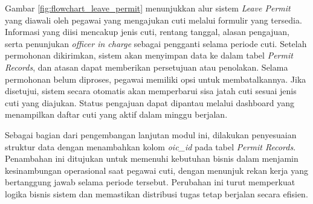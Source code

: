 Gambar \ref{fig:flowchart_leave_permit} menunjukkan alur sistem \textit{Leave Permit} yang diawali oleh pegawai yang mengajukan cuti melalui formulir yang tersedia. Informasi yang diisi mencakup jenis cuti, rentang tanggal, alasan pengajuan, serta penunjukan \textit{officer in charge} sebagai pengganti selama periode cuti. Setelah permohonan dikirimkan, sistem akan menyimpan data ke dalam tabel \textit{Permit Records}, dan atasan dapat memberikan persetujuan atau penolakan. Selama permohonan belum diproses, pegawai memiliki opsi untuk membatalkannya. Jika disetujui, sistem secara otomatis akan memperbarui sisa jatah cuti sesuai jenis cuti yang diajukan. Status pengajuan dapat dipantau melalui dashboard yang menampilkan daftar cuti yang aktif dalam minggu berjalan.

Sebagai bagian dari pengembangan lanjutan modul ini, dilakukan penyesuaian struktur data dengan menambahkan kolom \textit{oic\_id} pada tabel \textit{Permit Records}. Penambahan ini ditujukan untuk memenuhi kebutuhan bisnis dalam menjamin kesinambungan operasional saat pegawai cuti, dengan menunjuk rekan kerja yang bertanggung jawab selama periode tersebut. Perubahan ini turut memperkuat logika bisnis sistem dan memastikan distribusi tugas tetap berjalan secara efisien.


